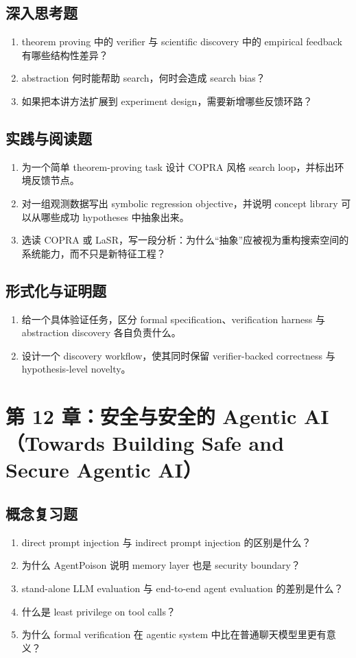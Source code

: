 \subsection*{深入思考题}
\begin{enumerate}
\item theorem proving 中的 verifier 与 scientific discovery 中的 empirical feedback 有哪些结构性差异？
\item abstraction 何时能帮助 search，何时会造成 search bias？
\item 如果把本讲方法扩展到 experiment design，需要新增哪些反馈环路？
\end{enumerate}

\subsection*{实践与阅读题}
\begin{enumerate}
\item 为一个简单 theorem-proving task 设计 COPRA 风格 search loop，并标出环境反馈节点。
\item 对一组观测数据写出 symbolic regression objective，并说明 concept library 可以从哪些成功 hypotheses 中抽象出来。
\item 选读 COPRA 或 LaSR，写一段分析：为什么“抽象”应被视为重构搜索空间的系统能力，而不只是新特征工程？
\end{enumerate}

\subsection*{形式化与证明题}
\begin{enumerate}
\item 给一个具体验证任务，区分 formal specification、verification harness 与 abstraction discovery 各自负责什么。
\item 设计一个 discovery workflow，使其同时保留 verifier-backed correctness 与 hypothesis-level novelty。
\end{enumerate}

\section{第 12 章：安全与安全的 Agentic AI（Towards Building Safe and Secure Agentic AI）}

\subsection*{概念复习题}
\begin{enumerate}
\item direct prompt injection 与 indirect prompt injection 的区别是什么？
\item 为什么 AgentPoison 说明 memory layer 也是 security boundary？
\item stand-alone LLM evaluation 与 end-to-end agent evaluation 的差别是什么？
\item 什么是 least privilege on tool calls？
\item 为什么 formal verification 在 agentic system 中比在普通聊天模型里更有意义？
\end{enumerate}

